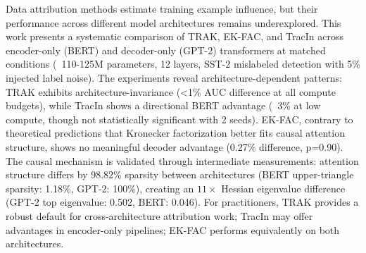 
Data attribution methods estimate training example influence, but their performance across different model architectures remains underexplored. This work presents a systematic comparison of TRAK, EK-FAC, and TracIn across encoder-only (BERT) and decoder-only (GPT-2) transformers at matched conditions (~110-125M parameters, 12 layers, SST-2 mislabeled detection with 5\% injected label noise). The experiments reveal architecture-dependent patterns: TRAK exhibits architecture-invariance (<1\% AUC difference at all compute budgets), while TracIn shows a directional BERT advantage (~3\% at low compute, though not statistically significant with 2 seeds). EK-FAC, contrary to theoretical predictions that Kronecker factorization better fits causal attention structure, shows no meaningful decoder advantage (0.27\% difference, p=0.90). The causal mechanism is validated through intermediate measurements: attention structure differs by 98.82\% sparsity between architectures (BERT upper-triangle sparsity: 1.18\%, GPT-2: 100\%), creating an $11\times$ Hessian eigenvalue difference (GPT-2 top eigenvalue: 0.502, BERT: 0.046). For practitioners, TRAK provides a robust default for cross-architecture attribution work; TracIn may offer advantages in encoder-only pipelines; EK-FAC performs equivalently on both architectures.
